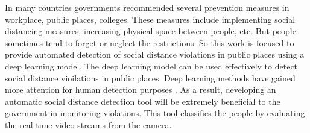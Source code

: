 \documentclass{svproc}
\begin{document}
\par 
In many countries governments recommended several prevention measures in workplace, public places, colleges. These measures include implementing social distancing measures, increasing physical space between people, etc. But people sometimes tend to forget or neglect the restrictions. So this work is focused to provide automated detection of social distance violations in public places using a deep learning model. The deep learning model can be used effectively to detect social distance vioilations in public places. Deep learning methods have gained more attention for human detection purposes \cite{humandetecion}. As a result, developing an automatic social distance detection tool will be extremely beneficial to the government in monitoring violations. This tool classifies the people by evaluating the real-time video streams from the camera.
\end{document}
